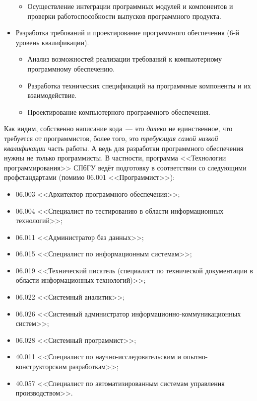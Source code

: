 \documentclass{../../text-style}
\begin{document}
\begin{itemize}
\begin{itemize}
        \item Осуществление интеграции программных модулей и компонентов и проверки работоспособности выпусков программного продукта.
    \end{itemize}
    \item Разработка требований и проектирование программного обеспечения (6-й уровень квалификации).
    \begin{itemize}
        \item Анализ возможностей реализации требований к компьютерному программному обеспечению.
        \item Разработка технических спецификаций на программные компоненты и их взаимодействие.
        \item Проектирование компьютерного программного обеспечения.
    \end{itemize}
\end{itemize}

Как видим, собственно написание кода~--- это \emph{далеко} не единственное, что требуется от программистов, более того, это \emph{требующая самой низкой квалификации} часть работы. А ведь для разработки программного обеспечения нужны не только программисты. В частности, программа <<Технологии программирования>> СПбГУ ведёт подготовку в соответствии со следующими профстандартами (помимо 06.001 <<Программист>>): 

\begin{itemize}
    \item 06.003 <<Архитектор программного обеспечения>>;
    \item 06.004 <<Специалист по тестированию в области информационных технологий>>;
    \item 06.011 <<Администратор баз данных>>;
    \item 06.015 <<Специалист по информационным системам>>;
    \item 06.019 <<Технический писатель (специалист по технической документации в области информационных технологий)>>;
    \item 06.022 <<Системный аналитик>>;
    \item 06.026 <<Системный администратор информационно-коммуникационных систем>>;
    \item 06.028 <<Системный программист>>;
    \item 40.011 <<Специалист по научно-исследовательским и опытно-конструкторским разработкам>>;
    \item 40.057 <<Специалист по автоматизированным системам управления производством>>.
\end{itemize}
\end{document}
